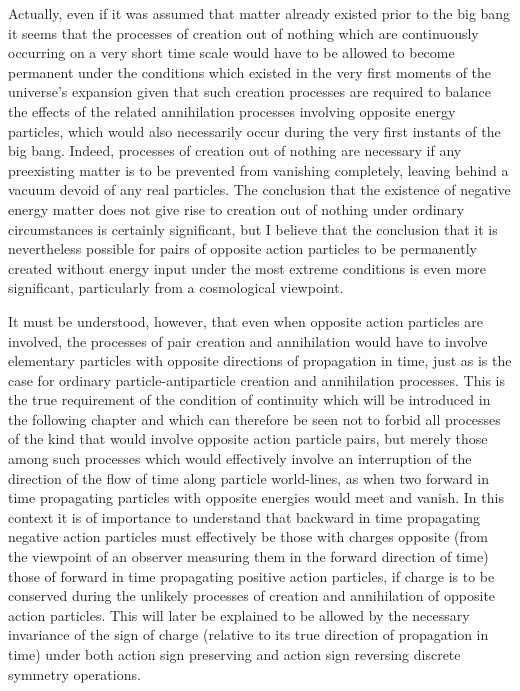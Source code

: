 \documentclass[notitlepage,12pt]{report}
\begin{document}
Actually, even if it was assumed that matter already existed prior to the big bang it seems that the processes of creation out of nothing which are continuously occurring on a very short time scale would have to be allowed to become permanent under the conditions which existed in the very first moments of the universe's expansion given that such creation processes are required to balance the effects of the related annihilation processes involving opposite energy particles, which would also necessarily occur during the very first instants of the big bang. Indeed, processes of creation out of nothing are necessary if any preexisting matter is to be prevented from vanishing completely, leaving behind a vacuum devoid of any real particles. The conclusion that the existence of negative energy matter does not give rise to creation out of nothing under ordinary circumstances is certainly significant, but I believe that the conclusion that it is nevertheless possible for pairs of opposite action particles to be permanently created without energy input under the most extreme conditions is even more significant, particularly from a cosmological viewpoint.

It must be understood, however, that even when opposite action particles are involved, the processes of pair creation and annihilation would have to involve elementary particles with opposite directions of propagation in time, just as is the case for ordinary particle-antiparticle creation and annihilation processes. This is the true requirement of the condition of continuity which will be introduced in the following chapter and which can therefore be seen not to forbid all processes of the kind that would involve opposite action particle pairs, but merely those among such processes which would effectively involve an interruption of the direction of the flow of time along particle world-lines, as when two forward in time propagating particles with opposite energies would meet and vanish. In this context it is of importance to understand that backward in time propagating negative action particles must effectively be those with charges opposite (from the viewpoint of an observer measuring them in the forward direction of time) those of forward in time propagating positive action particles, if charge is to be conserved during the unlikely processes of creation and annihilation of opposite action particles. This will later be explained to be allowed by the necessary invariance of the sign of charge (relative to its true direction of propagation in time) under both action sign preserving and action sign reversing discrete symmetry operations.
\end{document}
